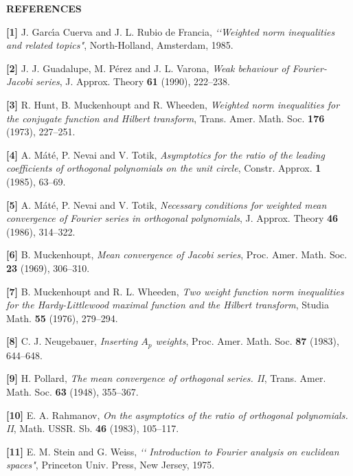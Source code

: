 \bigskip

\centerline {\bf REFERENCES}

\bigskip

\frenchspacing

\item {\bf [1]} {\cmcsc J. Garc\'\i a Cuerva} and {\cmcsc J. L. Rubio de
Francia}, {\it \lq \lq Weighted norm inequalities and related topics"},
North-Holland, Amsterdam, 1985.

\item {{\bf [2]}} {\cmcsc J. J. Guadalupe, M. P\'erez} and {\cmcsc J. L.
Varona}, {\it Weak behaviour of Fourier-Jacobi series}, J. Approx. Theory
{\bf 61} (1990), 222--238.

\item {{\bf [3]}} {\cmcsc R. Hunt, B. Muckenhoupt} and {\cmcsc R. Wheeden}, {\it
Weighted norm inequalities for the conjugate function and Hilbert transform},
Trans. Amer. Math. Soc. {\bf 176} (1973), 227--251.

\item {{\bf [4]}} {\cmcsc A. M\'at\'e, P. Nevai} and {\cmcsc V. Totik}, {\it
Asymptotics for the ratio of the leading coefficients of orthogonal polynomials
on the unit circle}, Constr. Approx. {\bf 1} (1985), 63--69.

\item {{\bf [5]}} {\cmcsc A. M\'at\'e, P. Nevai} and {\cmcsc V. Totik}, {\it
Necessary conditions for weighted mean convergence of Fourier series in
orthogonal polynomials}, J. Approx. Theory {\bf 46} (1986), 314--322.

\item {{\bf [6]}} {\cmcsc B. Muckenhoupt}, {\it Mean convergence of Jacobi
series}, Proc. Amer. Math. Soc. {\bf 23} (1969), 306--310.

\item {{\bf [7]}} {\cmcsc B. Muckenhoupt} and {\cmcsc R. L. Wheeden}, {\it Two
weight function norm inequalities for the Hardy-Littlewood maximal function and
the Hilbert transform}, Studia Math. {\bf 55} (1976), 279--294.

\item {{\bf [8]}} {\cmcsc C. J. Neugebauer}, {\it Inserting $A_p$ weights},
Proc. Amer. Math. Soc. {\bf 87} (1983), 644--648.

\item {{\bf [9]}} {\cmcsc H. Pollard}, {\it The mean convergence of orthogonal
series. II}, Trans. Amer. Math. Soc. {\bf 63} (1948), 355--367.

\item {{\bf [10]}} {\cmcsc E. A. Rahmanov}, {\it On the asymptotics of the ratio
of orthogonal polynomials. II}, Math. USSR. Sb. {\bf 46} (1983), 105--117.

\item {\bf [11]} {\cmcsc E. M. Stein} and {\cmcsc G. Weiss}, {\it \lq \lq
Introduction to Fourier analysis on euclidean spaces"}, Princeton Univ. Press,
New Jersey, 1975.


\bye
